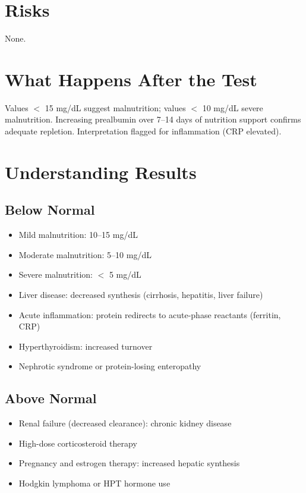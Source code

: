 \section*{Risks}
None.

\section*{What Happens After the Test}
Values $<$ 15 mg/dL suggest malnutrition; values $<$ 10 mg/dL severe malnutrition. Increasing prealbumin over 7--14 days of nutrition support confirms adequate repletion. Interpretation flagged for inflammation (CRP elevated).

\section*{Understanding Results}

\subsection*{Below Normal}
\begin{itemize}
  \item Mild malnutrition: 10--15 mg/dL
  \item Moderate malnutrition: 5--10 mg/dL
  \item Severe malnutrition: $<$ 5 mg/dL
  \item Liver disease: decreased synthesis (cirrhosis, hepatitis, liver failure)
  \item Acute inflammation: protein redirects to acute-phase reactants (ferritin, CRP)
  \item Hyperthyroidism: increased turnover
  \item Nephrotic syndrome or protein-losing enteropathy
\end{itemize}

\subsection*{Above Normal}
\begin{itemize}
  \item Renal failure (decreased clearance): chronic kidney disease
  \item High-dose corticosteroid therapy
  \item Pregnancy and estrogen therapy: increased hepatic synthesis
  \item Hodgkin lymphoma or HPT hormone use
\end{itemize}

